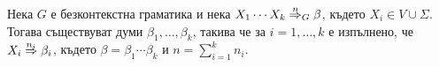 
  \begin{proposition}
    \label{pr:grammar:divide}
    Нека $G$ е безконтекстна граматика и нека $X_1\cdots X_k \stackrel{{n}}{\Rightarrow}_G \beta$, където $X_i \in V \cup \Sigma$.
    Тогава съществуват думи $\beta_1,\dots,\beta_k$, такива че за $i = 1,\dots, k$ е изпълнено, че
    $X_i \stackrel{{n_i}}{\Rightarrow} \beta_i$, където $\beta = \beta_1\cdots \beta_k$ и $n = \sum^k_{i = 1}n_i$.
  \end{proposition}




